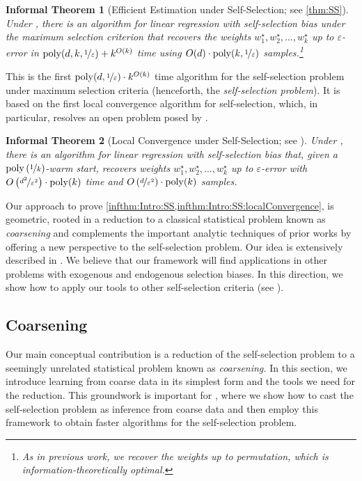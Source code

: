 \documentclass[11pt,letterpaper]{article}
\theoremstyle{plain}
\newtheorem{inftheorem}{Informal Theorem}
\theoremstyle{definition}
\theoremstyle{remark}
\newcommand{\inparen}[1]{\ensuremath{\left(#1\right)}}
\newcommand{\nfrac}[2]{\nicefrac{#1}{#2}}
\newcommand{\poly}{\mathrm{poly}}
\newcommand{\eps}{\varepsilon}
\newcommand{\negsep}{\vspace{0mm}}
\begin{document}
    \begin{inftheorem}[Efficient Estimation under Self-Selection; see \cref{thm:SS}]
        \label{infthm:Intro1}
        \label{infthm:Intro:SS}
        Under , there is an algorithm for linear regression with self-selection bias under the maximum selection criterion that recovers the weights $w^\star_1,w^\star_2,\dots,w^\star_k$ up to $\eps$-error in $\poly(d,k,\nfrac{1}{\eps}) + {k}^{O(k)}$ time using $O(d) \cdot \poly(k,\nfrac{1}{\eps})$ samples.\footnote{{As in previous work, we recover the weights up to permutation, which is information-theoretically optimal.}}
    \end{inftheorem}
    This is the first $\poly(d,\nfrac{1}{\eps}) \cdot k^{O(k)}$ time algorithm for the self-selection problem under maximum selection criteria (henceforth, the \textit{self-selection problem}).
    {It} is based on the first local convergence algorithm for self-selection, which, in particular, resolves an open problem posed by \cite{cherapanamjeri2023selfselection}.
    \begin{inftheorem}[Local Convergence under Self-Selection; see ]
\label{infthm:Intro:SS:localConvergence}
        Under , 
        there is an algorithm for linear regression with self-selection bias that, given a $\poly\inparen{\nfrac{1}{k}}$-warm start, 
        recovers weights $w_1^\star,w_2^\star,\dots,w_k^\star$ up to $\eps$-error with $O\inparen{\nfrac{d^2}{\eps^2}}\cdot \poly(k)$ time and $O\inparen{\nfrac{d}{\eps^2}}\cdot \poly(k)$ samples.
    \end{inftheorem} 
        Our approach to prove \cref{infthm:Intro:SS,infthm:Intro:SS:localConvergence},  
        is geometric, rooted in a reduction to a classical statistical problem known as \textit{coarsening} \cite{heitjan1990inference} and complements the important analytic techniques of prior works \cite{cherapanamjeri2023selfselection,gaitonde2024selfselection} 
        by offering a new perspective to the self-selection problem.
        Our idea is extensively described in .
        We believe that our framework will find applications in other problems with exogenous and endogenous selection biases. 
        In this direction, we show how to apply our tools to other self-selection criteria (see ). 

\negsep{}

\subsection{Coarsening}
\label{section:tool}
Our main conceptual contribution is a reduction of the self-selection problem to a seemingly unrelated statistical problem known as \emph{coarsening.}
In this section,  we introduce learning from coarse data in its simplest form and the tools we need for the reduction. 
This groundwork is important for , where we show how to {cast the self-selection problem as inference from coarse data and then} employ this framework to obtain faster algorithms for the self-selection problem.
\end{document}
